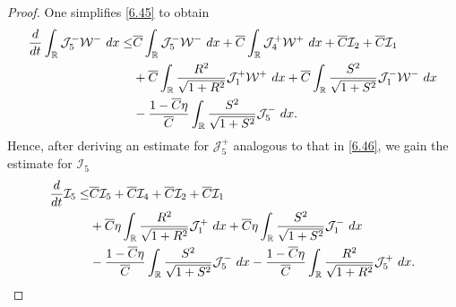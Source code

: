\documentclass[10pt,a4paper]{amsart}
\newcommand{\fr}{\frac}
\begin{document}
\begin{proof}
One simplifies \eqref{6.45} to obtain
\begin{align}\label{6.46}
\begin{split}
\fr{{\rm d}}{{\rm d}t}\int_{\mathbb{R}} \mathcal{J}_{5}^-\mathcal{W}^-\ {\rm d}x
\leq &\overline{C}\int_{\mathbb{R}} \mathcal{J}_{5}^- \mathcal{W}^-\ {\rm d}x +\overline{C}\int_{\mathbb{R}}  \mathcal{J}_{4}^+\mathcal{W}^+\ {\rm d}x +\overline{C}\mathcal{I}_2 +\overline{C}\mathcal{I}_1 \\
 &+\overline{C}\int_{\mathbb{R}}  \fr{R^2}{\sqrt{1+R^2}}\mathcal{J}_{1}^+\mathcal{W}^+\ {\rm d}x
+\overline{C}\int_{\mathbb{R}}  \fr{S^2}{\sqrt{1+S^2}}\mathcal{J}_{1}^-\mathcal{W}^-\ {\rm d}x \\ &-\fr{1-\overline{C}\eta}{\overline{C}}\int_{\mathbb{R}} \fr{S^2}{\sqrt{1+S^2}} \mathcal{J}_{5}^-\ {\rm d}x.
\end{split}
\end{align}
Hence, after deriving an estimate for $\mathcal{J}_{5}^+$ analogous to that in \eqref{6.46}, we gain the estimate for $\mathcal{I}_5$
\begin{align}\label{6.47}
\begin{split}
\fr{{\rm d}}{{\rm d}t}\mathcal{I}_5
\leq &\overline{C}\mathcal{I}_5 +\overline{C}\mathcal{I}_4 +\overline{C}\mathcal{I}_2 +\overline{C}\mathcal{I}_1 \\
 &+\overline{C}\eta\int_{\mathbb{R}}  \fr{R^2}{\sqrt{1+R^2}}\mathcal{J}_{1}^+\ {\rm d}x
+\overline{C}\eta\int_{\mathbb{R}}  \fr{S^2}{\sqrt{1+S^2}}\mathcal{J}_{1}^-\ {\rm d}x \\ &-\fr{1-\overline{C}\eta}{\overline{C}}\int_{\mathbb{R}} \fr{S^2}{\sqrt{1+S^2}} \mathcal{J}_{5}^-\ {\rm d}x -\fr{1-\overline{C}\eta}{\overline{C}}\int_{\mathbb{R}} \fr{R^2}{\sqrt{1+R^2}} \mathcal{J}_{5}^+\ {\rm d}x.
\end{split}
\end{align}



\end{proof}
\end{document}
